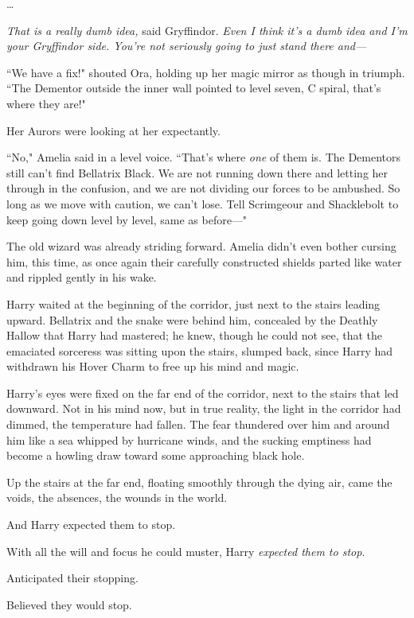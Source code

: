 {\ldots}

\emph{That is a really dumb idea,} said Gryffindor. \emph{Even I think it's a dumb idea and I'm your Gryffindor side. You're not seriously going to just stand there and—}

\later

``We have a fix!" shouted Ora, holding up her magic mirror as though in triumph. ``The Dementor outside the inner wall pointed to level seven, C spiral, that's where they are!"

Her Aurors were looking at her expectantly.

``No," Amelia said in a level voice. ``That's where \emph{one} of them is. The Dementors still can't find Bellatrix Black. We are not running down there and letting her through in the confusion, and we are not dividing our forces to be ambushed. So long as we move with caution, we can't lose. Tell Scrimgeour and Shacklebolt to keep going down level by level, same as before—"

The old wizard was already striding forward. Amelia didn't even bother cursing him, this time, as once again their carefully constructed shields parted like water and rippled gently in his wake.

\later

Harry waited at the beginning of the corridor, just next to the stairs leading upward. Bellatrix and the snake were behind him, concealed by the Deathly Hallow that Harry had mastered; he knew, though he could not see, that the emaciated sorceress was sitting upon the stairs, slumped back, since Harry had withdrawn his Hover Charm to free up his mind and magic.

Harry's eyes were fixed on the far end of the corridor, next to the stairs that led downward. Not in his mind now, but in true reality, the light in the corridor had dimmed, the temperature had fallen. The fear thundered over him and around him like a sea whipped by hurricane winds, and the sucking emptiness had become a howling draw toward some approaching black hole.

Up the stairs at the far end, floating smoothly through the dying air, came the voids, the absences, the wounds in the world.

And Harry expected them to stop.

With all the will and focus he could muster, Harry \emph{expected them to stop}.

Anticipated their stopping.

Believed they would stop.

